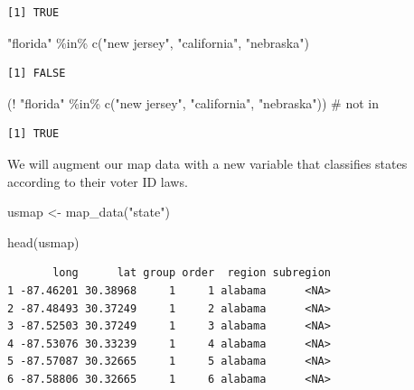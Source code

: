 \documentclass[
  letterpaper,
  DIV=11,
  numbers=noendperiod]{scrreprt}
\newenvironment{Shaded}{\begin{snugshade}}{\end{snugshade}}
\newcommand{\CommentTok}[1]{\textcolor[rgb]{0.37,0.37,0.37}{#1}}
\newcommand{\FunctionTok}[1]{\textcolor[rgb]{0.28,0.35,0.67}{#1}}
\newcommand{\NormalTok}[1]{\textcolor[rgb]{0.00,0.23,0.31}{#1}}
\newcommand{\OtherTok}[1]{\textcolor[rgb]{0.00,0.23,0.31}{#1}}
\newcommand{\SpecialCharTok}[1]{\textcolor[rgb]{0.37,0.37,0.37}{#1}}
\newcommand{\StringTok}[1]{\textcolor[rgb]{0.13,0.47,0.30}{#1}}
\begin{document}
\begin{verbatim}
[1] TRUE
\end{verbatim}

\begin{Shaded}
\begin{Highlighting}[]
\StringTok{"florida"} \SpecialCharTok{\%in\%} \FunctionTok{c}\NormalTok{(}\StringTok{"new jersey"}\NormalTok{, }\StringTok{"california"}\NormalTok{, }\StringTok{"nebraska"}\NormalTok{)}
\end{Highlighting}
\end{Shaded}

\begin{verbatim}
[1] FALSE
\end{verbatim}

\begin{Shaded}
\begin{Highlighting}[]
\NormalTok{(}\SpecialCharTok{!} \StringTok{"florida"} \SpecialCharTok{\%in\%} \FunctionTok{c}\NormalTok{(}\StringTok{"new jersey"}\NormalTok{, }\StringTok{"california"}\NormalTok{, }\StringTok{"nebraska"}\NormalTok{)) }\CommentTok{\# not in}
\end{Highlighting}
\end{Shaded}

\begin{verbatim}
[1] TRUE
\end{verbatim}

We will augment our map data with a new variable that classifies states
according to their voter ID laws.

\begin{Shaded}
\begin{Highlighting}[]
\NormalTok{usmap }\OtherTok{\textless{}{-}} \FunctionTok{map\_data}\NormalTok{(}\StringTok{"state"}\NormalTok{)}

\FunctionTok{head}\NormalTok{(usmap)}
\end{Highlighting}
\end{Shaded}

\begin{verbatim}
       long      lat group order  region subregion
1 -87.46201 30.38968     1     1 alabama      <NA>
2 -87.48493 30.37249     1     2 alabama      <NA>
3 -87.52503 30.37249     1     3 alabama      <NA>
4 -87.53076 30.33239     1     4 alabama      <NA>
5 -87.57087 30.32665     1     5 alabama      <NA>
6 -87.58806 30.32665     1     6 alabama      <NA>
\end{verbatim}
\end{document}
